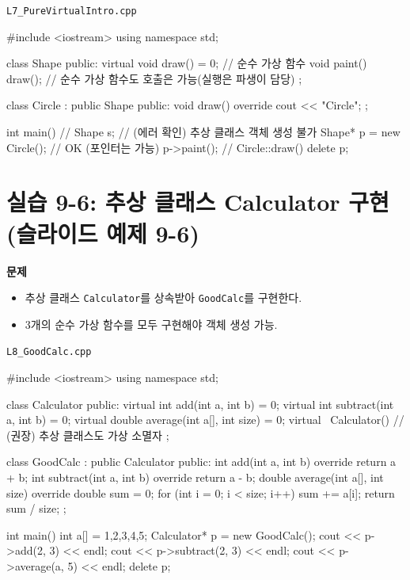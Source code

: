 \documentclass[11pt,a4paper]{article}
\newcommand{\filetag}[1]{\texttt{\color{Accent}#1}}
\begin{document}
\noindent\filetag{L7\_PureVirtualIntro.cpp}
\begin{cppcode}
#include <iostream>
using namespace std;

class Shape {
public:
    virtual void draw() = 0; // 순수 가상 함수
    void paint() { draw(); } // 순수 가상 함수도 호출은 가능(실행은 파생이 담당)
};

class Circle : public Shape {
public:
    void draw() override { cout << "Circle\n"; }
};

int main() {
    // Shape s;             // (에러 확인) 추상 클래스 객체 생성 불가
    Shape* p = new Circle();  // OK (포인터는 가능)
    p->paint();               // Circle::draw()
    delete p;
}
\end{cppcode}

\section{실습 9-6: 추상 클래스 Calculator 구현 (슬라이드 예제 9-6)}
\begin{GoalBox}
\textbf{문제}
\begin{itemize}[leftmargin=18pt]
  \item 추상 클래스 \texttt{Calculator}를 상속받아 \texttt{GoodCalc}를 구현한다.
  \item 3개의 순수 가상 함수를 모두 구현해야 객체 생성 가능.
\end{itemize}
\end{GoalBox}

\noindent\filetag{L8\_GoodCalc.cpp}
\begin{cppcode}
#include <iostream>
using namespace std;

class Calculator {
public:
    virtual int add(int a, int b) = 0;
    virtual int subtract(int a, int b) = 0;
    virtual double average(int a[], int size) = 0;
    virtual ~Calculator() {} // (권장) 추상 클래스도 가상 소멸자
};

class GoodCalc : public Calculator {
public:
    int add(int a, int b) override { return a + b; }
    int subtract(int a, int b) override { return a - b; }
    double average(int a[], int size) override {
        double sum = 0;
        for (int i = 0; i < size; i++) sum += a[i];
        return sum / size;
    }
};

int main() {
    int a[] = {1,2,3,4,5};
    Calculator* p = new GoodCalc();
    cout << p->add(2, 3) << endl;
    cout << p->subtract(2, 3) << endl;
    cout << p->average(a, 5) << endl;
    delete p;
}
\end{cppcode}
\end{document}
